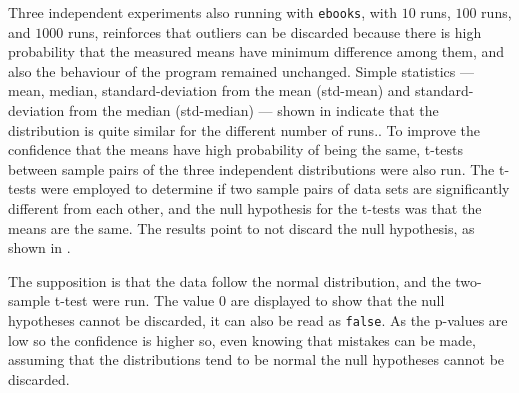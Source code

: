 Three independent experiments also running \bzip with {\tt ebooks}, with $10$ runs, $100$ runs, and $1000$ runs, reinforces that outliers can be discarded because there is high probability that the measured means have minimum difference among them, and also the behaviour of the program remained unchanged. 
Simple statistics --- mean, median, standard-deviation from the mean (std-mean) and standard-deviation from the median (std-median) --- shown in  indicate that the distribution is quite similar for the different number of runs.. 
To improve the confidence that the means have high probability of being the same, t-tests between sample pairs of the three independent distributions were also run. The t-tests were employed to determine if two sample pairs of data sets are significantly different from each other, and the null hypothesis for the t-tests was that the means are the same. The results point to not discard the null hypothesis, as shown in .

The supposition is that the data follow the normal distribution, and the two-sample t-test were run. The value $0$ are displayed to show that the null hypotheses cannot be discarded, it can also be read as {\tt false}. As the p-values are low so the confidence is higher so, even knowing that mistakes can be made, assuming that the distributions tend to be normal the null hypotheses cannot be discarded.

